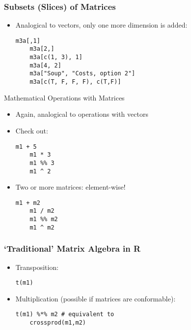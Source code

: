 \documentclass[10pt]{beamer}
\theoremstyle{definition}
\begin{document}
\begin{frame}[fragile]
\frametitle{Subsets (Slices) of Matrices}
\begin{itemize}
	\item Analogical to vectors, only one more dimension is added:
	\begin{lstlisting}[style = rstyle, breaklines]
	m3a[,1]
	m3a[2,]
	m3a[c(1, 3), 1]
	m3a[4, 2]
	m3a["Soup", "Costs, option 2"]
	m3a[c(T, F, F, F), c(T,F)]
	\end{lstlisting}
\end{itemize}
\end{frame}

\begin{frame}[fragile]{Mathematical Operations with Matrices}
\begin{itemize}
	\item Again, analogical to operations with vectors

	\item Check out:
	\begin{lstlisting}[style = rstyle, breaklines]
	m1 + 5
	m1 * 3
	m1 %% 3
	m1 ^ 2	
	\end{lstlisting}
	
	\item Two or more matrices: element-wise!
	\begin{lstlisting}[style = rstyle, breaklines]
	m1 + m2
	m1 / m2
	m1 %% m2
	m1 ^ m2 
	\end{lstlisting}
\end{itemize}
\end{frame}

\begin{frame}[fragile]
\frametitle{`Traditional' Matrix Algebra in R}
\begin{itemize}
	\item Transposition:
	\begin{lstlisting}[style = rstyle, breaklines]
	t(m1)
	\end{lstlisting}

	\item Multiplication (possible if matrices are conformable):
	\begin{lstlisting}[style = rstyle, breaklines]
	t(m1) %*% m2 # equivalent to
	crossprod(m1,m2)
	\end{lstlisting}
\end{itemize}
\end{frame}
\end{document}
